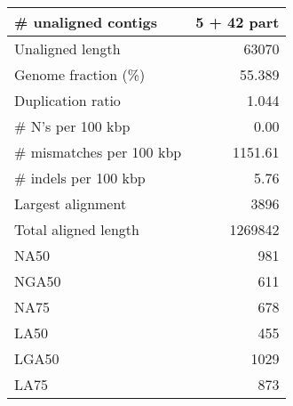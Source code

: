\documentclass[12pt,a4paper]{article}
\begin{document}
\begin{table}[ht]
\begin{center}
\begin{tabular}{|l*{1}{|r}|}
\# unaligned contigs & 5 + 42 part \\ \hline
Unaligned length & 63070 \\ \hline
Genome fraction (\%) & 55.389 \\ \hline
Duplication ratio & 1.044 \\ \hline
\# N's per 100 kbp & 0.00 \\ \hline
\# mismatches per 100 kbp & 1151.61 \\ \hline
\# indels per 100 kbp & 5.76 \\ \hline
Largest alignment & 3896 \\ \hline
Total aligned length & 1269842 \\ \hline
NA50 & 981 \\ \hline
NGA50 & 611 \\ \hline
NA75 & 678 \\ \hline
LA50 & 455 \\ \hline
LGA50 & 1029 \\ \hline
LA75 & 873 \\ \hline
\end{tabular}
\end{center}
\end{table}
\end{document}
